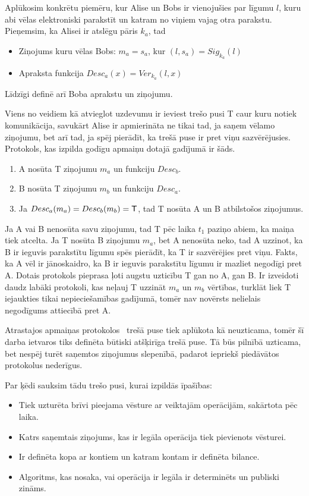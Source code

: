 Aplūkosim konkrētu piemēru, kur Alise un Bobs ir vienojušies par līgumu $l$, kuru abi vēlas elektroniski parakstīt un katram no viņiem vajag otra parakstu. Pieņemsim, ka Alisei ir atslēgu pāris $k_a$, tad
\begin{itemize}
    \item Ziņojums kuru vēlas Bobs: $m_a = s_a$, kur $(l, s_a) = Sig_{k_a}(l)$
    \item Apraksta funkcija $Desc_a(x) = Ver_{k_a}(l, x)$
\end{itemize}
Līdzīgi definē arī Boba aprakstu un ziņojumu.

Viens no veidiem kā atvieglot uzdevumu ir ieviest trešo pusi T caur kuru notiek komunikācija, savukārt Alise ir apmierināta ne tikai tad, ja saņem vēlamo ziņojumu, bet arī tad, ja spēj pierādīt, ka trešā puse ir pret viņu sazvērējusies.
Protokols, kas izpilda godīgu apmaiņu dotajā gadījumā ir šāds.
\begin{enumerate}
    \item A nosūta T ziņojumu $m_a$ un funkciju $Desc_b$.
    \item B nosūta T ziņojumu $m_b$ un funkciju $Desc_a$.
    \item Ja $Desc_a(m_a) = Desc_b(m_b) = \textsf{T}$, tad T nosūta A un B atbilstošos ziņojumus.
\end{enumerate}
Ja A vai B nenosūta savu ziņojumu, tad T pēc laika $t_1$ paziņo abiem, ka maiņa tiek atcelta. Ja T nosūta B ziņojumu $m_a$, bet A nenosūta neko, tad A uzzinot, ka B ir ieguvis parakstītu līgumu spēs pierādīt, ka T ir sazvērējies pret viņu. Fakts, ka A vēl ir jānoskaidro, ka B ir ieguvis parakstītu līgumu ir mazliet negodīgi pret A. Dotais protokols pieprasa ļoti augstu uzticību T gan no A, gan B. Ir izveidoti daudz labāki protokoli, kas neļauj T uzzināt $m_a$ un $m_b$ vērtības, turklāt liek T iejaukties tikai nepieciešamības gadījumā, tomēr nav novērsts nelielais negodīgums attiecībā pret A.\cite{asokan98}

Atrastajos apmaiņas protokolos~\cite{asokan98,schunter00}%
trešā puse tiek aplūkota kā neuzticama, tomēr šī darba ietvaros tiks definēta būtiski atšķirīga trešā puse. Tā būs pilnībā uzticama, bet nespēj turēt saņemtos ziņojumus slepenībā, padarot iepriekš piedāvātos protokolus nederīgus.

Par ķēdi sauksim tādu trešo pusi, kurai izpildās īpašības:
\begin{itemize}
    \item Tiek uzturēta brīvi pieejama vēsture ar veiktajām operācijām, sakārtota pēc laika.
    \item Katrs saņemtais ziņojums, kas ir legāla operācija tiek pievienots vēsturei.
    \item Ir definēta kopa ar kontiem un katram kontam ir definēta bilance.
    \item Algoritms, kas nosaka, vai operācija ir legāla ir determinēts un publiski zināms.
\end{itemize}

